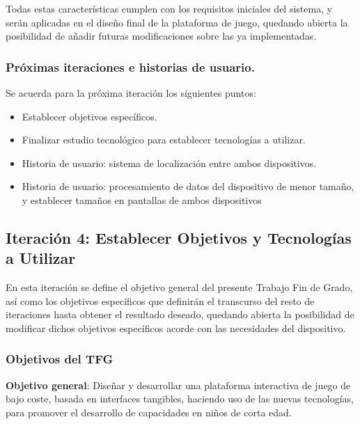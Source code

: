 Todas estas características cumplen con los requisitos iniciales del sistema, y serán aplicadas en el diseño final de la plataforma de juego, quedando abierta la posibilidad de añadir futuras modificaciones sobre las ya implementadas.

\subsubsection{Próximas iteraciones e historias de usuario.}
Se acuerda para la próxima iteración los siguientes puntos:
\begin{itemize}
\item Establecer objetivos específicos.
\item Finalizar estudio tecnológico para establecer tecnologías a utilizar.
\item Historia de usuario: sistema de localización entre ambos dispositivos.
\item Historia de usuario: procesamiento de datos del dispositivo de menor tamaño, y establecer tamaños en pantallas de ambos dispositivos
\end{itemize}


\subsection{Iteración 4: Establecer Objetivos y Tecnologías a Utilizar}

En esta iteración se define el objetivo general del presente Trabajo Fin de Grado, así como los objetivos específicos que definirán el transcurso del resto de iteraciones hasta obtener el resultado deseado, quedando abierta la posibilidad de modificar dichos objetivos específicos acorde con las necesidades del dispositivo.

\subsubsection{Objetivos del TFG}


\textbf{Objetivo general}: Diseñar y desarrollar una plataforma interactiva de juego de bajo coste, basada en interfaces tangibles, haciendo uso de las nuevas tecnologías, para promover el desarrollo de capacidades en niños de corta edad.

